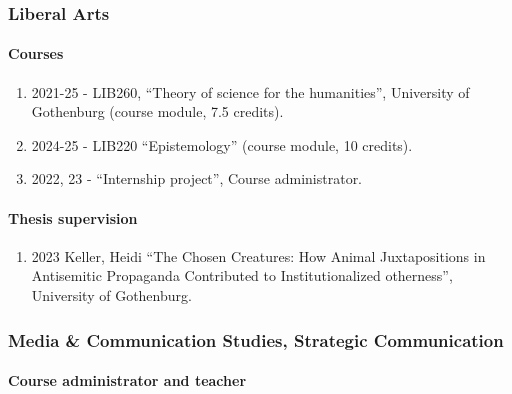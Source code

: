 \documentclass[
]{article}
\providecommand{\tightlist}{%
  \setlength{\itemsep}{0pt}\setlength{\parskip}{0pt}}
\begin{document}
\hypertarget{liberal-arts}{%
\subsubsection{Liberal Arts}\label{liberal-arts}}

\hypertarget{courses}{%
\paragraph{Courses}\label{courses}}

\begin{enumerate}
\def\labelenumi{\arabic{enumi}.}
\tightlist
\item
  2021-25 - LIB260, ``Theory of science for the humanities'', University
  of Gothenburg (course module, 7.5 credits).
\item
  2024-25 - LIB220 ``Epistemology'' (course module, 10 credits).
\item
  2022, 23 - ``Internship project'', Course administrator.
\end{enumerate}

\hypertarget{thesis-supervision}{%
\paragraph{Thesis supervision}\label{thesis-supervision}}

\begin{enumerate}
\def\labelenumi{\arabic{enumi}.}
\tightlist
\item
  2023 Keller, Heidi ``The Chosen Creatures: How Animal Juxtapositions
  in Antisemitic Propaganda Contributed to Institutionalized
  otherness'', University of Gothenburg.
\end{enumerate}

\hypertarget{media-communication-studies-strategic-communication}{%
\subsubsection{Media \& Communication Studies, Strategic
Communication}\label{media-communication-studies-strategic-communication}}

\hypertarget{course-administrator-and-teacher-1}{%
\paragraph{Course administrator and
teacher}\label{course-administrator-and-teacher-1}}
\end{document}
